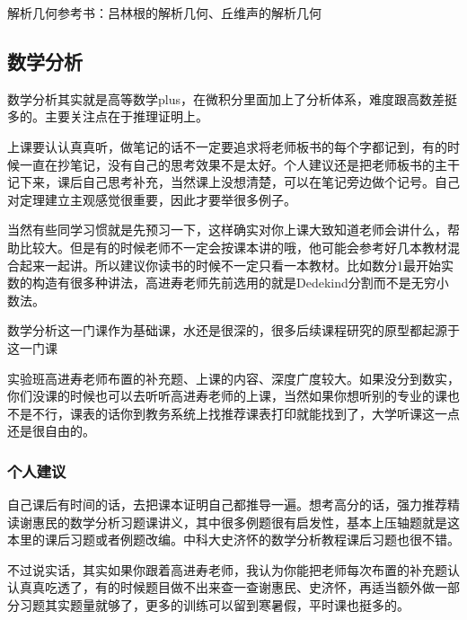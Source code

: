 \documentclass{my_paper}
\begin{document}
解析几何参考书：吕林根的解析几何、丘维声的解析几何

\subsection{数学分析}
数学分析其实就是高等数学plus，在微积分里面加上了分析体系，难度跟高数差挺多的。主要关注点在于推理证明上。

上课要认认真真听，做笔记的话不一定要追求将老师板书的每个字都记到，有的时候一直在抄笔记，没有自己的思考效果不是太好。个人建议还是把老师板书的主干记下来，课后自己思考补充，当然课上没想清楚，可以在笔记旁边做个记号。自己对定理建立主观感觉很重要，因此才要举很多例子。

当然有些同学习惯就是先\textcolor[rgb]{1,0,0}{预习}一下，这样确实对你上课大致知道老师会讲什么，帮助比较大。但是有的时候老师不一定会按课本讲的哦，他可能会参考好几本教材混合起来一起讲。所以建议你读书的时候不一定只看一本教材。比如数分1最开始实数的构造有很多种讲法，高进寿老师先前选用的就是Dedekind分割而不是无穷小数法。

数学分析这一门课作为基础课，水还是很深的，很多后续课程研究的原型都起源于这一门课

实验班高进寿老师布置的补充题、上课的内容、深度广度较大。如果没分到数实，你们没课的时候也可以去听听高进寿老师的上课，当然如果你想听别的专业的课也不是不行，课表的话你到教务系统上找推荐课表打印就能找到了，大学听课这一点还是很自由的。

\subsubsection{个人建议}
自己课后有时间的话，去把课本证明自己都推导一遍。想考高分的话，强力推荐精读谢惠民的数学分析习题课讲义，其中很多例题很有启发性，基本上压轴题就是这本里的课后习题或者例题改编。中科大史济怀的数学分析教程课后习题也很不错。

不过说实话，其实如果你跟着高进寿老师，我认为你能把老师每次布置的\textcolor[rgb]{1,0,0}{补充题}认认真真吃透了，有的时候题目做不出来查一查谢惠民、史济怀，再适当额外做一部分习题其实题量就够了，更多的训练可以留到寒暑假，平时课也挺多的。
\end{document}
